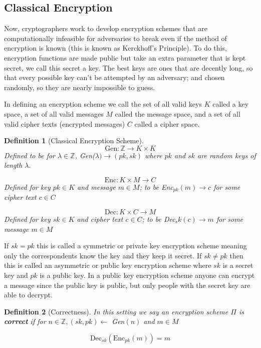 \documentclass[12pt,twoside]{reedthesis}
\newtheorem{definition}{Definition}
\begin{document}
    \subsection{Classical Encryption}
    Now, cryptographers work to develop encryption schemes that are computationally infeasible for adversaries to break even if the method of encryption is known (this is known as Kerckhoff's Principle). To do this, encryption functions are made public but take an extra parameter that is kept secret, we call this secret a key. The best keys are ones that are decently long, so that every possible key can't be attempted by an adversary; and chosen randomly, so they are nearly impossible to guess. 
    \par In defining an encryption scheme we call the set of all valid keys $K$ called a key space, a set of all valid messages $M$ called the message space, and a set of all valid cipher texts (encrypted messages) $C$ called a cipher space.
 \\

\begin{definition}[Classical Encryption Scheme]
     
 
 $$\text{Gen}:\mathbb{Z} \rightarrow K \times K$$
 Defined to be for $\lambda \in \mathbb{Z}$, Gen($\lambda ) \rightarrow (pk,sk)$ where $pk$ and $sk$ are random keys of length $\lambda$.
 
  $$\text{Enc}:K \times M \rightarrow C$$
Defined for key $pk\in K$ and message $m\in M$; to be Enc$_{pk}(m) \rightarrow c$ for some cipher text $c\in C$
 
 $$\text{Dec}:K \times C \rightarrow M$$
 Defined for key $sk \in K$ and cipher text $c\in C$; to be Dec$_sk(c) \rightarrow m$ for some message $m\in M$
 
 \end{definition}
 
 
\par If $sk = pk$ this is called a symmetric or private key encryption scheme meaning only the correspondents know the key and they keep it secret. If $sk \not= pk$ then this is called an asymmetric or public key encryption scheme where $sk$ is a secret key and $pk$ is a public key. In a public key encryption scheme anyone can encrypt a message since the public key is public, but only people with the secret key are able to decrypt.


\begin{definition}[Correctness]
In this setting we say an encryption scheme $\Pi$ is \textbf{correct} if for $n\in \mathbb{Z} , (sk,pk) \leftarrow$ Gen$(n)$ and $m\in M$ 

$$\text{Dec}_{sk}(\text{Enc}_{pk}(m)) = m$$
\end{definition}
\end{document}
